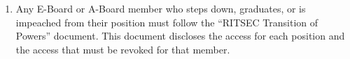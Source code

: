 

\begin{enumerate}
	\item Any E-Board or A-Board member who steps down, graduates, or is impeached from
	      their position must follow the “RITSEC Transition of Powers” document. This
	      document discloses the access for each position and the access that must be
	      revoked for that member.
\end{enumerate}